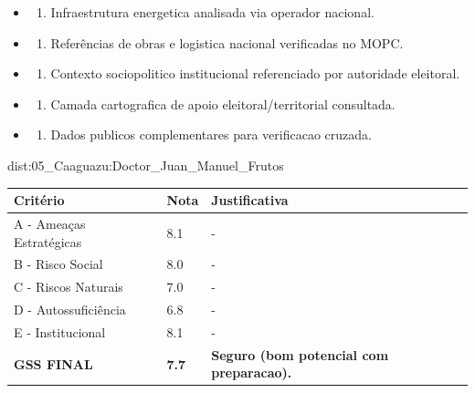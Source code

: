 {\begin{itemize}
\item
  \begin{enumerate}
  \def\labelenumi{\arabic{enumi})}
  \setcounter{enumi}{7}
  \tightlist
  \item
    Infraestrutura energetica analisada via operador nacional.
  \end{enumerate}
\item
  \begin{enumerate}
  \def\labelenumi{\arabic{enumi})}
  \setcounter{enumi}{8}
  \tightlist
  \item
    Referências de obras e logistica nacional verificadas no MOPC.
  \end{enumerate}
\item
  \begin{enumerate}
  \def\labelenumi{\arabic{enumi})}
  \setcounter{enumi}{9}
  \tightlist
  \item
    Contexto sociopolitico institucional referenciado por autoridade
    eleitoral.
  \end{enumerate}
\item
  \begin{enumerate}
  \def\labelenumi{\arabic{enumi})}
  \setcounter{enumi}{10}
  \tightlist
  \item
    Camada cartografica de apoio eleitoral/\allowbreak territorial consultada.
  \end{enumerate}
\item
  \begin{enumerate}
  \def\labelenumi{\arabic{enumi})}
  \setcounter{enumi}{11}
  \tightlist
  \item
    Dados publicos complementares para verificacao cruzada.
  \end{enumerate}
\end{itemize}}{dist:05_Caaguazu:Doctor_Juan_Manuel_Frutos}
\begin{table}[ht!]
\small \begin{tabular}{p{3.0cm}p{0.8cm}p{6.0cm}} \toprule
\textbf{Critério} & \textbf{Nota} & \textbf{Justificativa} \\ \midrule
A - Ameaças Estratégicas & 8.1 & - \\
B - Risco Social & 8.0 & - \\
C - Riscos Naturais & 7.0 & - \\
D - Autossuficiência & 6.8 & - \\
E - Institucional & 8.1 & - \\
\midrule \textbf{GSS FINAL} & \textbf{7.7} & \textbf{Seguro (bom potencial com preparacao).} \\ \bottomrule \end{tabular}
\end{table}
